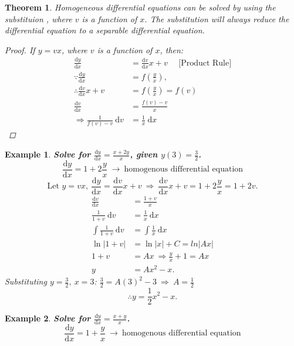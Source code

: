 \documentclass[12pt, a4paper]{article}
\newtheorem{theorem}{Theorem}[subsection]
\newtheorem{example}{Example}[subsection]
\newtheorem{proof}{Proof}[subsection]
\def\d{{\mathrm{d}}}
\begin{document}
\begin{enumerate}
    \begin{theorem}
        Homogeneous differential equations can be solved by using the substituion \textbf{\color{red}{$y=vx$}}, where $v$ is a function of $x$. The substitution will always reduce the differential equation to a separable differential equation. 
        \begin{proof}
            If $y=vx$, where $v$ is a function of $x$, then: 
            $$\begin{aligned}
                \frac{\d y}{\d x}&=\frac{\d v}{\d x}x+v\ \ \ \ \ \ \text{[Product Rule]}\\
                \because \frac{\d y}{\d x}&=f\left(\frac{y}{x}\right),\\
                \therefore \frac{\d v}{\d x}x+v&=f\left(\frac{y}{x}\right)=f(v)\\
                \frac{\d v}{\d x}&=\frac{f(v)-v}{x}\\
                \Rightarrow \frac{1}{f(v)-v}\ \d v&=\frac{1}{x}\ \d x
            \end{aligned}$$
        \end{proof}
    \end{theorem}
    \begin{example}
        \textbf{Solve for $\frac{\d y}{\d x}=\frac{x+2y}{x}$, given $y(3)=\frac{3}{2}$.}
        $$\frac{\d y}{\d x}=1+2\frac{y}{x}\ \rightarrow\ \text{homogenous differential equation}$$
        $$\text{Let }y=vx,\ \frac{\d y}{\d x}=\frac{\d v}{\d x}x+v\ \Rightarrow\ \frac{\d v}{\d x}x+v=1+2\frac{y}{x}=1+2v.$$
        $$\begin{aligned}
            \frac{\d v}{\d x}&=\frac{1+v}{x}\\
            \frac{1}{1+v}\ \d v&=\frac{1}{x}\ \d x\\
            \int \frac{1}{1+v}\ \d v&=\int \frac{1}{x}\ \d x\\
            \ln|1+v|&=\ln|x|+C=ln|Ax|\\
            1+v&=Ax\ \Rightarrow \frac{y}{x}+1=Ax\\
            y&=Ax^2-x.
        \end{aligned}$$
        Substituting $y=\frac{3}{2},\ x=3$: $\frac{3}{2}=A(3)^2-3\ \Rightarrow\ A=\frac{1}{2}$
        $$\therefore y=\frac{1}{2}x^2-x.$$
    \end{example}
    \begin{example}
        \textbf{Solve for $\frac{\d y}{\d x}=\frac{x+y}{x}$.}
        $$\frac{\d y}{\d x}=1+\frac{y}{x}\ \rightarrow\ \text{homogenous differential equation}$$

\end{example}
\end{enumerate}
\end{document}
